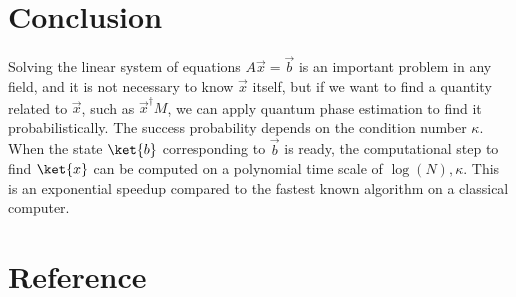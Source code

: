 \documentclass[b5paper,papersize,dvipdfmx,fleqn]{article}
\begin{document}
\section{Conclusion}
Solving the linear system of equations $A\vec{x}=\vec{b}$ is an important problem in any field\cite{Harrow2009}, and it is not necessary to know $\vec{x}$ itself, but if we want to find a quantity related to $\vec{x}$, such as $\vec{x}^\dagger M$, we can apply quantum phase estimation to find it probabilistically. The success probability depends on the condition number $\kappa $.
When the state $\ket{b}$ corresponding to $\vec{b}$ is ready, the computational step to find $\ket{x}$ can be computed on a polynomial time scale of $\log(N), \kappa $. This is an exponential speedup compared to the fastest known algorithm on a classical computer.


\section{Reference}


%
%
%

\end{document}
